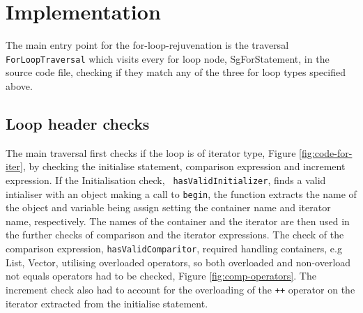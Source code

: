 \documentclass[bsc,frontabs,singlespacing,parskip,deptreport]{infthesis}
\begin{document}

    

\section{Implementation}

The main entry point for the for-loop-rejuvenation is the traversal \texttt{ForLoopTraversal} which visits every for loop node, SgForStatement, in the source code file, checking if they match any of the three for loop types specified above.

\subsection{Loop header checks}

The main traversal first checks if the loop is of iterator type, Figure \ref{fig:code-for-iter}, by checking the initialise statement, comparison expression and increment expression. If the Initialisation check, \texttt{ hasValidInitializer}, finds a valid intialiser with an object making a call to \texttt{begin}, the function extracts the name of the object and variable being assign setting the container name and iterator name, respectively. The names of the container and the iterator are then used in the further checks of comparison and the iterator expressions. The check of the comparison expression, \texttt{hasValidComparitor}, required handling containers, e.g List, Vector, utilising overloaded operators, so both overloaded and non-overload not equals operators had to be checked, Figure \ref{fig:comp-operators}. The increment check also had to account for the overloading of the \texttt{++} operator on the iterator extracted from the initialise statement. 
\end{document}
